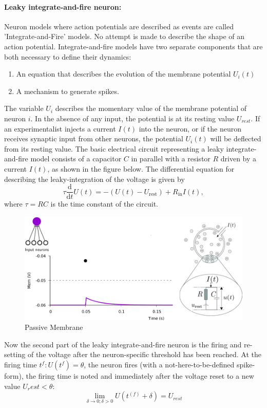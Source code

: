 \documentclass[main]{subfiles}
\begin{document}
\paragraph{Leaky integrate-and-fire neuron: }
Neuron models where action potentials are described as events are called 'Integrate-and-Fire' models. No attempt is made to describe the shape of an action potential. Integrate-and-fire models have two separate components that are both necessary to define their dynamics:
\begin{enumerate}
    \item An equation that describes the evolution of the membrane potential $U_i(t)$
    \item A mechanism to generate spikes.
\end{enumerate}
The variable $U_i$ describes the momentary value of the membrane potential of neuron $i$. In the absence of any input, the potential is at its resting value $U_{rest}$. If an experimentalist injects a current $I(t)$ into the neuron, or if the neuron receives synaptic input from other neurons, the potential $U_i(t)$ will be deflected from its resting value. The basic electrical circuit representing a leaky integrate-and-fire model consists of a capacitor $C$ in parallel with a resistor $R$ driven by a current $I(t)$, as shown in the figure below. The differential equation for describing the leaky-integration of the voltage is given by
%
\begin{equation}
\tau \frac{\mathrm{d}}{\mathrm{d} t} U(t)=-\left(U(t)-U_{\mathrm{rest}}\right)+R_{\mathrm{in}} I(t),
\end{equation}
where $\tau = RC$ is the time constant of the circuit. 
%
\begin{figure}[H]
    \centering
    \includegraphics[width=0.8\linewidth]{10_DeepLearningWithSpikes/figures/passive_membrane.png}
    \caption{Passive Membrane}
    \label{fig:my_label}
\end{figure}
%
Now the second part of the leaky integrate-and-fire neuron is the firing and re-setting of the voltage after the neuron-specific threshold has been reached. At the firing time $t^{f}: U(t^{f}) = \theta$, the neuron fires (with a not-here-to-be-defined spike-form), the firing time is noted and immediately after the voltage reset to a new value $U_rest < \theta$:
\begin{equation}
    \lim_{\delta \to 0; \delta > 0} U(t^{(f)} + \delta) = U_{rest}
\end{equation}
%
\end{document}
